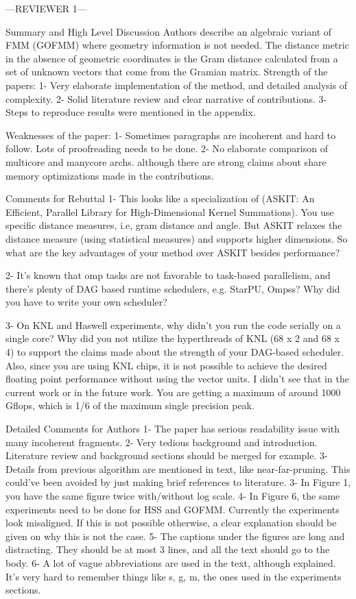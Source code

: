 ---REVIEWER 1---

Summary and High Level Discussion
Authors describe an algebraic variant of FMM (GOFMM) where geometry
information is not needed. The distance metric in the absence of geometric
coordinates is the Gram distance calculated from a set of unknown vectors that
come from the Gramian matrix. 
Strength of the papers: 
1- Very elaborate implementation of the method, and detailed analysis of
complexity.
2- Solid literature review and clear narrative of contributions.
3- Steps to reproduce results were mentioned in the appendix. 

Weaknesses of the paper:
1- Sometimes paragraphs are incoherent and hard to follow. Lots of
proofreading needs to be done.
2- No elaborate comparison of multicore and manycore archs. although there are
strong claims about share memory optimizations made in the contributions.

Comments for Rebuttal
1- This looks like a specialization of (ASKIT: An Efficient, Parallel Library
    for High-Dimensional Kernel Summations). You use specific distance
measures, i.e, gram distance and angle. But ASKIT relaxes the distance
measure (using statistical measures) and supports higher dimensions. So what
are the key advantages of your method over ASKIT besides performance?

2- It's known that omp tasks are not favorable to task-based parallelism, and
there's plenty of DAG based runtime schedulers, e.g. StarPU, Ompss? Why did
you have to write your own scheduler?

3- On KNL and Haswell experiments, why didn't you run the code serially on a
single core? Why did you not utilize the hyperthreads of KNL (68 x 2 and 68 x
    4) to support the claims made about the strength of your DAG-based
scheduler. 
Also, since you are using KNL chips, it is not possible to achieve the
desired floating point performance without using the vector units. I didn't
see that in the current work or in the future work. You are getting a maximum
of around 1000 Gflops, which is 1/6 of the maximum single precision peak.

Detailed Comments for Authors
1- The paper has serious readability issue with many incoherent fragments. 
2- Very tedious background and introduction. Literature review and
background sections should be merged for example. 
3- Details from previous algorithm are mentioned in text, like
near-far-pruning. This could've been avoided by just making brief references
to literature. 
3- In Figure 1, you have the same figure twice with/without log scale.
4- In Figure 6, the same experiments need to be done for HSS and GOFMM.
Currently the experiments look misaligned. If this is not possible
otherwise, a clear explanation should be given on why this is not the case.
5- The captions under the figures are long and distracting. They should be
at most 3 lines, and all the text should go to the body. 
6- A lot of vague abbreviations are used in the text, although explained.
It's very hard to remember things like s, g, m, the ones used in the
experiments sections.

